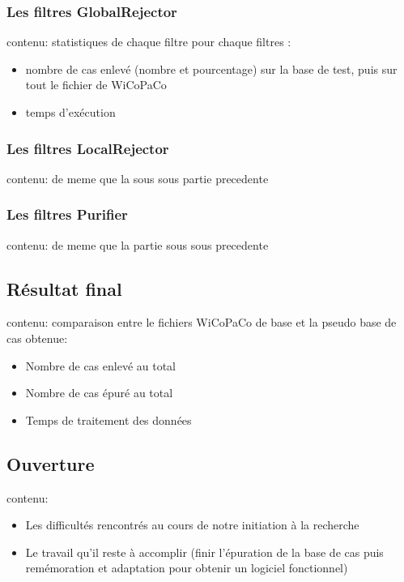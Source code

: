 \documentclass[11pt]{article}
\begin{document}
\subsubsection{Les filtres GlobalRejector}
contenu:
statistiques de chaque filtre 
pour chaque filtres :
\begin{itemize}
\item nombre de cas enlev\'{e} (nombre et pourcentage) sur la base de test, puis sur tout le fichier de WiCoPaCo
\item temps d'ex\'{e}cution
\end{itemize}

\subsubsection{Les filtres LocalRejector}
contenu:
de meme que la sous sous partie precedente

\subsubsection{Les filtres Purifier}
contenu:
de meme que la partie sous sous precedente

\subsection{R\'{e}sultat final}
contenu:
comparaison entre le fichiers WiCoPaCo de base et la pseudo base de cas obtenue:
\begin{itemize}
\item Nombre de cas enlev\'{e} au total
\item Nombre de cas \'{e}pur\'{e} au total
\item Temps de traitement des donn\'{e}es
\end{itemize}

\subsection{Ouverture}
contenu:
\begin{itemize}
\item Les difficult\'{e}s rencontr\'{e}s au cours de notre initiation \`{a} la recherche
\item Le travail qu'il reste \`{a} accomplir (finir l'\'{e}puration de la base de cas puis rem\'{e}moration et adaptation pour obtenir un logiciel fonctionnel)
\end{itemize}
\end{document}
